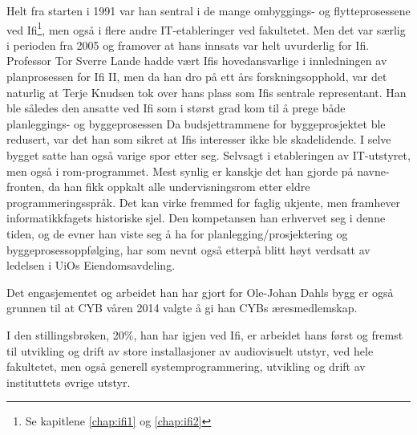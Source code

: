 Helt fra starten i 1991 var han sentral i de mange ombyggings- og flytteprosessene ved Ifi\footnote{Se kapitlene \ref{chap:ifi1} og \ref{chap:ifi2}}, men også i flere andre IT-etableringer ved fakultetet. Men det var særlig i perioden fra 2005 og framover at hans innsats var helt uvurderlig for Ifi. Professor Tor Sverre Lande hadde vært Ifis hovedansvarlige i innledningen av planprosessen for Ifi II, men da han dro på ett års forskningsopphold, var det naturlig at Terje Knudsen tok over hans plass som Ifis sentrale representant. Han ble således den ansatte ved Ifi som i størst grad kom til å prege både planleggings- og byggeprosessen Da budsjettrammene for byggeprosjektet ble redusert, var det han som sikret at Ifis interesser ikke ble skadelidende. I selve bygget satte han også varige spor etter seg. Selvsagt i etableringen av IT-utstyret, men også i rom-programmet. Mest synlig er kanskje det han gjorde på navne-fronten, da han fikk oppkalt alle undervisningsrom etter eldre programmeringsspråk. Det kan virke fremmed for faglig ukjente, men framhever informatikkfagets historiske sjel. Den kompetansen han erhvervet seg i denne tiden, og de evner han viste seg å ha for planlegging\slash prosjektering og byggeprosessoppfølging, har som nevnt også etterpå blitt høyt verdsatt av ledelsen i UiOs Eiendomsavdeling.

Det engasjementet og arbeidet han har gjort for Ole-Johan Dahls bygg er også grunnen til at CYB våren 2014 valgte å gi han CYBs æresmedlemskap.

I den stillingsbrøken, 20\%, han har igjen ved Ifi, er arbeidet hans først og fremst til utvikling og drift av store installasjoner av audiovisuelt utstyr, ved hele fakultetet, men også generell systemprogrammering, utvikling og drift av instituttets øvrige utstyr.

